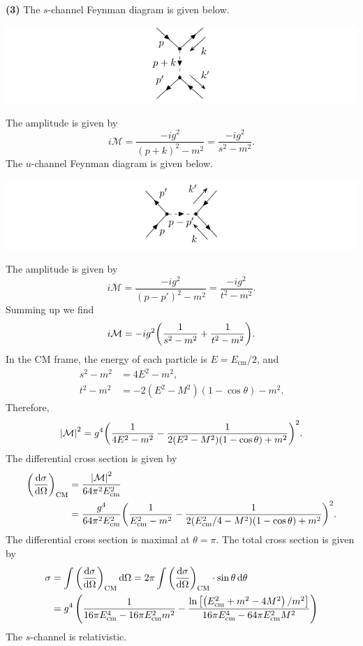 \documentclass{article}
\makeatletter
\newcommand*{\shifttext}[1]{%
  \settowidth{\@tempdima}{#1}%
  \hspace{-\@tempdima}#1%
}
\newcommand{\plabel}[1]{%
\shifttext{\textbf{#1}\quad}%
}
\makeatother
\begin{document}
\plabel{(3)}%
The $s$-channel Feynman diagram is given below.
\begin{center}
    \includegraphics{img/bhabha/bhabha-s.pdf}
\end{center}
The amplitude is given by
\[ i\mathcal{M} = \frac{-ig^2}{(p+k)^2 - m^2} = \frac{-ig^2}{s^2-m^2}. \]
The $u$-channel Feynman diagram is given below.
\begin{center}
    \includegraphics{img/bhabha/bhabha-t.pdf}
\end{center}
The amplitude is given by
\[ i\mathcal{M} = \frac{-ig^2}{(p-p')^2 - m^2} = \frac{-ig^2}{t^2-m^2}. \]
Summing up we find
\[ i\mathcal{M} = -ig^2\qty(\frac{1}{s^2 - m^2} + \frac{1}{t^2 - m^2}). \]
In the CM frame, the energy of each particle is $E = E_{\mathrm{cm}} / 2$, and
\begin{align*}
    s^2 - m^2 &= 4E^2 - m^2, \\
    t^2 - m^2 &= -2(E^2 - M^2)(1 - \cos\theta) - m^2.
\end{align*}
Therefore,
\[ \abs{\mathcal{M}}^2 = g^4\qty(\frac{1}{4E^2 - m^2} - \frac{1}{2(E^2 - M^2)(1 - \cos\theta) + m^2})^2. \]
The differential cross section is given by
\begin{align*}
    \qty(\dv{\sigma}{\Omega})_{\mathrm{CM}} &= \frac{\abs{\mathcal{M}}^2}{64\pi^2 E^2_{\mathrm{cm}}} \\
    &= \frac{g^4}{64 \pi^2 E_{\mathrm{cm}}^2} \qty(\frac{1}{E_{\mathrm{cm}}^2 - m^2} - \frac{1}{2(E_{\mathrm{cm}}^2/4 - M^2)(1 - \cos\theta) + m^2})^2.
\end{align*}
The differential cross section is maximal at $\theta = \pi$.
The total cross section is given by
\begin{align*}
    \sigma &= \int \qty(\dv{\sigma}{\Omega})_{\mathrm{CM}} \dd{\Omega} = 2\pi \int \qty(\dv{\sigma}{\Omega})_{\mathrm{CM}} \cdot \sin\theta \dd{\theta} \\
    &= g^4 \left(\frac{1}{16 \pi  E_{\mathrm{cm}}^4-16 \pi  E_{\mathrm{cm}}^2 m^2}-\frac{\ln \qty[\left(E_{\mathrm{cm}}^2+m^2-4 M^2\right)/m^2]}{16 \pi  E_{\mathrm{cm}}^4-64 \pi  E_{\mathrm{cm}}^2 M^2}\right)
\end{align*}
The $s$-channel is relativistic.
\end{document}
